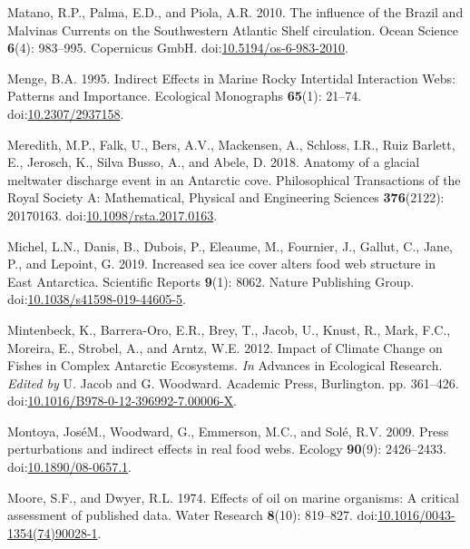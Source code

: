 \documentclass[
]{article}
\newlength{\cslhangindent}
\newenvironment{CSLReferences}[2] %
 {\begin{list}{}{%
  \setlength{\itemindent}{0pt}
  \setlength{\leftmargin}{0pt}
  \setlength{\parsep}{0pt}
  \ifodd #1
   \setlength{\leftmargin}{\cslhangindent}
   \setlength{\itemindent}{-1\cslhangindent}
  \fi
  \setlength{\itemsep}{#2\baselineskip}}}
 {\end{list}}
\begin{document}
\begin{CSLReferences}{1}{0}
Matano, R.P., Palma, E.D., and Piola, A.R. 2010. The influence of the
{Brazil} and {Malvinas Currents} on the {Southwestern Atlantic Shelf}
circulation. Ocean Science \textbf{6}(4): 983--995. Copernicus GmbH.
doi:\href{https://doi.org/10.5194/os-6-983-2010}{10.5194/os-6-983-2010}.

Menge, B.A. 1995. Indirect {Effects} in {Marine Rocky Intertidal
Interaction Webs}: {Patterns} and {Importance}. Ecological Monographs
\textbf{65}(1): 21--74.
doi:\href{https://doi.org/10.2307/2937158}{10.2307/2937158}.

Meredith, M.P., Falk, U., Bers, A.V., Mackensen, A., Schloss, I.R., Ruiz
Barlett, E., Jerosch, K., Silva Busso, A., and Abele, D. 2018. Anatomy
of a glacial meltwater discharge event in an {Antarctic} cove.
Philosophical Transactions of the Royal Society A: Mathematical,
Physical and Engineering Sciences \textbf{376}(2122): 20170163.
doi:\href{https://doi.org/10.1098/rsta.2017.0163}{10.1098/rsta.2017.0163}.

Michel, L.N., Danis, B., Dubois, P., Eleaume, M., Fournier, J., Gallut,
C., Jane, P., and Lepoint, G. 2019. Increased sea ice cover alters food
web structure in {East Antarctica}. Scientific Reports \textbf{9}(1):
8062. Nature Publishing Group.
doi:\href{https://doi.org/10.1038/s41598-019-44605-5}{10.1038/s41598-019-44605-5}.

Mintenbeck, K., Barrera-Oro, E.R., Brey, T., Jacob, U., Knust, R., Mark,
F.C., Moreira, E., Strobel, A., and Arntz, W.E. 2012. Impact of {Climate
Change} on {Fishes} in {Complex Antarctic Ecosystems}. \emph{In}
Advances in {Ecological Research}. \emph{Edited by} U. Jacob and G.
Woodward. Academic Press, Burlington. pp. 361--426.
doi:\href{https://doi.org/10.1016/B978-0-12-396992-7.00006-X}{10.1016/B978-0-12-396992-7.00006-X}.

Montoya, JoséM., Woodward, G., Emmerson, M.C., and Solé, R.V. 2009.
Press perturbations and indirect effects in real food webs. Ecology
\textbf{90}(9): 2426--2433.
doi:\href{https://doi.org/10.1890/08-0657.1}{10.1890/08-0657.1}.

Moore, S.F., and Dwyer, R.L. 1974. Effects of oil on marine organisms:
{A} critical assessment of published data. Water Research
\textbf{8}(10): 819--827.
doi:\href{https://doi.org/10.1016/0043-1354(74)90028-1}{10.1016/0043-1354(74)90028-1}.


\end{CSLReferences}
\end{document}

